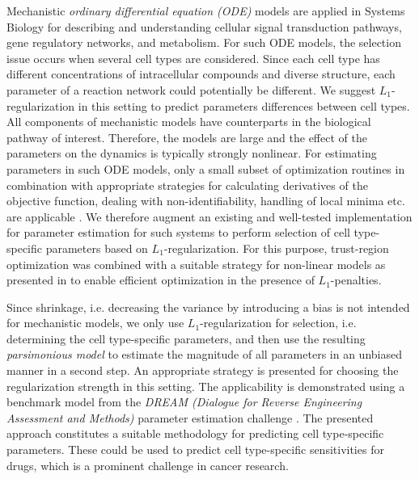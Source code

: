 \documentclass{bioinfo}
\begin{document}
Mechanistic  \emph{ordinary differential equation (ODE)} models are applied in Systems Biology for describing and understanding cellular signal transduction pathways, gene regulatory networks, and metabolism.
For such ODE models, the selection issue occurs when several cell types are considered. 
Since each cell type has different concentrations of intracellular compounds and diverse structure, each parameter of a reaction network could potentially be different. 
We suggest $L_1$-regularization in this setting to predict parameters differences between cell types.
All components of mechanistic models have counterparts in the biological pathway of interest. 
Therefore, the models are large and the effect of the parameters on the dynamics is typically strongly nonlinear. 
For estimating parameters in such ODE models, only a small subset of optimization routines in combination with appropriate strategies for calculating derivatives of the objective function, dealing with non-identifiability, handling of local minima etc. are applicable \citep{Raue2013}. 
We therefore augment an existing and well-tested implementation for parameter estimation for such systems \citep{Raue2015} to perform selection of cell type-specific parameters based on $L_1$-regularization. 
For this purpose, trust-region optimization \citep{Coleman96} was combined with a suitable strategy for non-linear models as presented in \citep{Schmidt09} to enable efficient optimization in the presence of $L_1$-penalties.

Since shrinkage, i.e. decreasing the variance by introducing a bias is not intended for mechanistic models, we only use $L_1$-regularization for selection, i.e. determining the cell type-specific parameters, and then use the resulting \emph{parsimonious model} to estimate the magnitude of all parameters in an unbiased manner in a second step. 
An appropriate strategy is presented for choosing the regularization strength in this setting. 
The applicability is demonstrated using a benchmark model from the \emph{DREAM (Dialogue for Reverse Engineering Assessment and Methods)} parameter estimation challenge \citep{Meyer2014}. 
The presented approach constitutes a suitable methodology for predicting cell type-specific parameters.
These could be used to predict cell type-specific sensitivities for drugs, which is a prominent challenge in cancer research.
\end{document}
